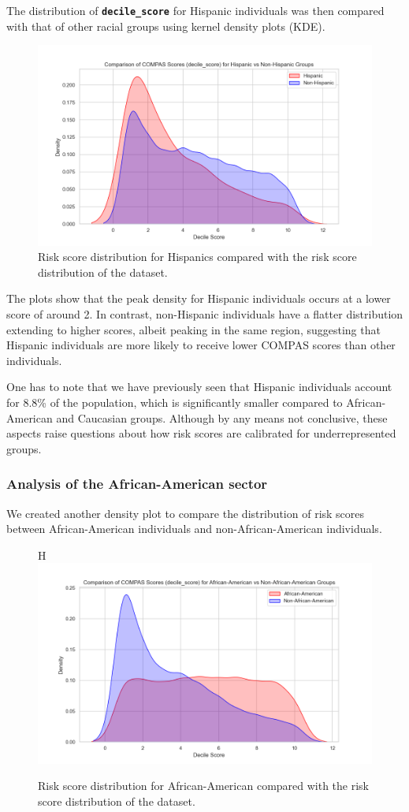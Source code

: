 The distribution of \textbf{\texttt{decile\_score}} for Hispanic individuals was then compared with that of other racial groups using kernel density plots (KDE). 

\begin{figure}[H]
	\centering
	\includegraphics[width=0.7\linewidth]{img/decile_score_by_race_hispanic}
	\caption{Risk score distribution for Hispanics compared with the risk score distribution of the dataset.}
	\label{fig:decilescorebyracehispanic}
\end{figure}


The plots show that the peak density for Hispanic individuals occurs at a lower score of around 2. In contrast, non-Hispanic individuals have a flatter distribution extending to higher scores, albeit peaking in the same region, suggesting that Hispanic individuals are more likely to receive lower COMPAS scores than other individuals.

One has to note that we have previously seen that Hispanic individuals account for 8.8\% of the population, which is significantly smaller compared to African-American and Caucasian groups.
Although by any means not conclusive, these aspects raise questions about how risk scores are calibrated for underrepresented groups.

\subsubsection{Analysis of the African-American sector}


We created another density plot to compare the distribution of risk scores between African-American individuals and non-African-American individuals.

\begin{figure}[]H
	\centering
	\includegraphics[width=0.7\linewidth]{img/decile_score_by_race_african_american}
	\caption{Risk score distribution for African-American compared with the risk score distribution of the dataset.}
	\label{fig:decilescorebyraceafricanamerican}
\end{figure}


